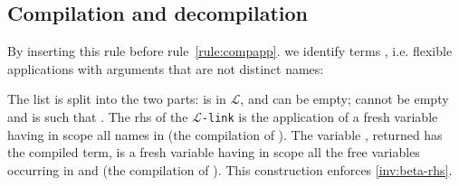 \documentclass[sigconf,natbib=false,review]{acmart}
\newcommand{\appsep}{\ensuremath{\textcolor{lightgray}{\cdot}}}
\newcommand{\llambda}{\ensuremath{\mathcal{L}}\xspace}
\newcommand{\linkMacro}[1]{\ensuremath{#1}\texttt{-link}\xspace}
\newcommand{\linkbeta}{\linkMacro{\llambda}}
\newcommand{\Fo}{\texorpdfstring{\ensuremath{\mathcal{O}\xspace}}{O}} %
\newcommand{\linkbetaM}[3]{\ensuremath{#1 \vdash #2 =_{\llambda} #3}}
\newcommand{\rhs}{rhs\xspace}
\newcommand{\linkStore}{\texorpdfstring{\ensuremath{\mathbb{L}}\xspace}{L}}
\begin{document}

\subsection{Compilation and decompilation}

By inserting this rule
before rule~\ref{rule:compapp}.
we identify terms \notllambda, i.e. flexible applications with arguments that
are not distinct names:



\noindent
The list  is split into the two parts: 
 is in \llambda, and can be empty; 
 cannot be empty and is such that
.
The \rhs of the \linkbeta is
the application of a fresh variable  having
in scope all names in  (the compilation of ).
The variable , returned has the compiled term, is a fresh variable
having in scope all the free variables occurring in  and
 (the compilation of ).
This construction enforces \cref{inv:beta-rhs}.



\end{document}
